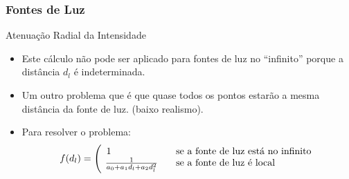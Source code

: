 \documentclass{beamer}
\begin{document}
\begin{frame}
\frametitle{Fontes de Luz}

	\begin{block}{Atenuação Radial da Intensidade}
		\begin{itemize}
			\item Este cálculo não pode ser aplicado para fontes de luz no ``infinito'' porque a distância $d_l$ é indeterminada.
			\item Um outro problema que é que quase todos os pontos estarão a mesma distância da fonte de luz. (baixo realismo).
			\item Para resolver o problema:
			\begin{equation*}
				f(d_l) = \Big{(
  \begin{array}{l l}
    1 & \quad \text{se a fonte de luz está no infinito}\\
    \frac{1}{a_0 + a_1d_l + a_2d^{2}_{l}} & \quad \text{se a fonte de luz é local}
  \end{array} }
			\end{equation*}			 
		\end{itemize}
	\end{block}
\end{frame}

\end{document}
